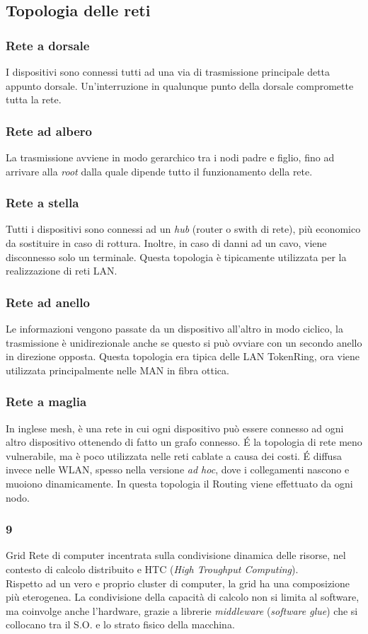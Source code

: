 \documentclass[a4paper,11pt]{article}
\def\subsub#1{\subsubsection{#1}\label{#1}}
\def\italic#1{\textit{#1}}
\begin{document}
\subsection{Topologia delle reti}
\subsub{Rete a dorsale}
I dispositivi sono connessi tutti ad una via di trasmissione principale detta appunto dorsale. Un'interruzione in qualunque punto della dorsale compromette tutta la rete.
\subsub{Rete ad albero} La trasmissione avviene in modo gerarchico tra i nodi padre e figlio, fino ad arrivare alla \textit{root} dalla quale dipende tutto il funzionamento della rete.
\subsub{Rete a stella} Tutti i dispositivi sono connessi ad un \italic{hub} (router o swith di rete), più economico da sostituire in caso di rottura. Inoltre, in caso di danni ad un cavo, viene disconnesso solo un terminale. Questa topologia è tipicamente utilizzata per la realizzazione di reti LAN.
\subsub{Rete ad anello} Le informazioni vengono passate da un dispositivo all'altro in modo ciclico, la trasmissione è unidirezionale anche se questo si può ovviare con un secondo anello in direzione opposta. Questa topologia era tipica delle LAN TokenRing, ora viene utilizzata principalmente nelle MAN in fibra ottica.
\subsub{Rete a maglia} In inglese mesh, è una rete in cui ogni dispositivo può essere connesso ad ogni altro dispositivo ottenendo di fatto un grafo connesso. \'E la topologia di rete meno vulnerabile, ma è poco utilizzata nelle reti cablate a causa dei costi. \'E diffusa invece nelle WLAN, spesso nella versione \textit{ad hoc}, dove i collegamenti nascono e muoiono dinamicamente. In questa topologia il Routing viene effettuato da ogni nodo.
\subsub9{Grid}
Rete di computer incentrata sulla condivisione dinamica delle risorse, nel contesto di calcolo distribuito e HTC (\textit{High Troughput Computing}).\\ Rispetto ad un vero e proprio cluster di computer, la grid ha una composizione più eterogenea. La condivisione della capacità di calcolo non si limita al software, ma coinvolge anche l'hardware, grazie a librerie \textit{middleware} (\textit{software glue}) che si collocano tra il S.O. e lo strato fisico della macchina.%
\newpage
\end{document}
